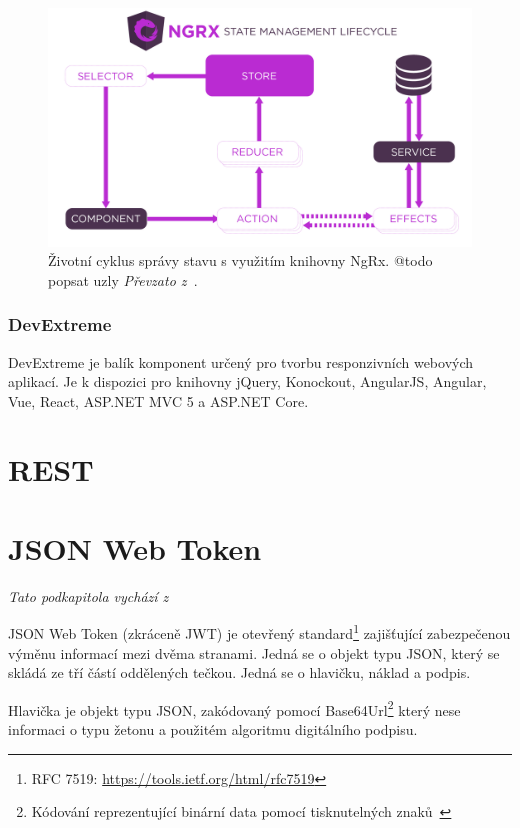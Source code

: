 \blindtext
\begin{figure}[H]
	\centering
	\includegraphics[width=\textwidth]{obrazky-figures/ngrx-lifecycle.png}
	\caption{Životní cyklus správy stavu s využitím knihovny NgRx. @todo popsat uzly \emph{Převzato z~\cite{bib:ngrx-lifecycle}}.}
\end{figure}
\blindtext

\subsubsection{DevExtreme}
DevExtreme je balík komponent určený pro tvorbu responzivních webových aplikací. Je k dispozici pro knihovny jQuery, Konockout, AngularJS, Angular, Vue, React, ASP.NET MVC 5 a ASP.NET Core.  
\blindtext

\section{REST}
\blindtext[2]

\section{JSON Web Token}
\emph{Tato podkapitola vychází z~\cite{bib:jwt}}

JSON Web Token (zkráceně JWT) je otevřený standard\footnote{RFC 7519: \url{https://tools.ietf.org/html/rfc7519}} zajišťující zabezpečenou výměnu informací mezi dvěma stranami. Jedná se o objekt typu JSON, který se skládá ze tří částí oddělených tečkou. Jedná se o hlavičku, náklad a podpis.

Hlavička je objekt typu JSON, zakódovaný pomocí Base64Url\footnote{Kódování reprezentující binární data pomocí tisknutelných znaků~\cite{bib:base64}} který nese informaci o typu žetonu a použitém algoritmu digitálního podpisu. 


